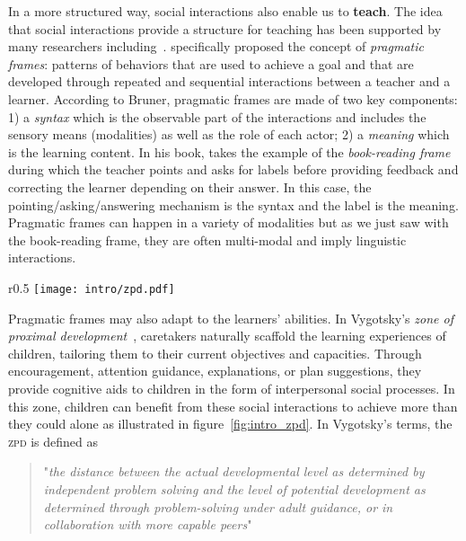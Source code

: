 In a more structured way, social interactions also enable us to \textbf{teach}. The idea that social interactions provide a structure for teaching has been supported by many researchers including~\citet{vygotsky_play_1933,bruner1985child, rohlfing_alternative_2016,vollmer2016pragmatic}. \citet{bruner1985child} specifically proposed the concept of \textit{pragmatic frames}: patterns of behaviors that are used to achieve a goal and that are developed through repeated and sequential interactions between a teacher and a learner. According to Bruner, pragmatic frames are made of two key components: 1) a \textit{syntax} which is the observable part of the interactions and includes the sensory means (modalities) as well as the role of each actor; 2) a \textit{meaning} which is the learning content. In his book, \citet{bruner1985child} takes the example of the \textit{book-reading frame} during which the teacher points and asks for labels before providing feedback and correcting the learner depending on their answer. In this case, the pointing/asking/answering mechanism is the syntax and the label is the meaning. Pragmatic frames can happen in a variety of modalities but as we just saw with the book-reading frame, they are often multi-modal and imply linguistic interactions.


\begin{wrapfigure}{r}{0.5\textwidth}
\centering
\texttt{[image: intro/zpd.pdf]}
\caption{ZPD Illustration}
\label{fig:intro_zpd}
\end{wrapfigure}
%
Pragmatic frames may also adapt to the learners' abilities. In Vygotsky's \textit{zone of proximal development}~\citep{vygotsky_thought_1934}, caretakers naturally scaffold the learning experiences of children, tailoring them to their current objectives and capacities. Through encouragement, attention guidance, explanations, or plan suggestions, they provide cognitive aids to children in the form of interpersonal social processes. In this zone, children can benefit from these social interactions to achieve more than they could alone as illustrated in figure~\ref{fig:intro_zpd}. In Vygotsky's terms, the \textsc{zpd} is defined as
\begin{quote}
"\textit{the distance between the actual developmental level as determined by independent problem solving and the level of potential development as determined through problem-solving under adult guidance, or in collaboration with more capable peers}"~\citep{vygotsky_thought_1934}	
\end{quote}



